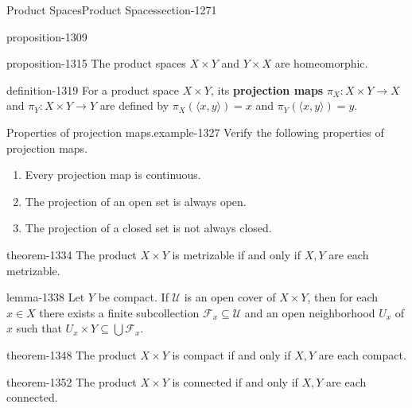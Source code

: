 \documentclass[oneside,10pt,]{article}
\newcommand{\terminology}[1]{\textbf{#1}}
\newcommand{\tuple}[1]{\langle #1 \rangle}
\newcommand{\mc}{\mathcal}
\begin{document}
\begin{sectionptx}{Product Spaces}{}{Product Spaces}{}{}{section-1271}
\begin{proposition}{}{}{proposition-1309}
\end{proposition}
\begin{proposition}{}{}{proposition-1315}%
\hypertarget{p-1316}{}%
The product spaces \(X\times Y\) and \(Y\times X\) are homeomorphic.%
\end{proposition}
\begin{definition}{}{definition-1319}%
\hypertarget{p-1320}{}%
For a product space \(X\times Y\), its \terminology{projection maps} \(\pi_X:X\times Y\to X\) and \(\pi_Y:X\times Y\to Y\) are defined by \(\pi_X(\tuple{x,y})=x\) and \(\pi_Y(\tuple{x,y})=y\).%
\end{definition}
\begin{example}{Properties of projection maps.}{example-1327}%
\hypertarget{p-1329}{}%
Verify the following properties of projection maps.%
\leavevmode%
\begin{enumerate}
\item\hypertarget{li-1331}{}Every projection map is continuous.%
\item\hypertarget{li-1332}{}The projection of an open set is always open.%
\item\hypertarget{li-1333}{}The projection of a closed set is not always closed.%
\end{enumerate}
\end{example}
\begin{theorem}{}{}{theorem-1334}%
\hypertarget{p-1335}{}%
The product \(X\times Y\) is metrizable if and only if \(X,Y\) are each metrizable.%
\end{theorem}
\begin{lemma}{}{}{lemma-1338}%
\hypertarget{p-1339}{}%
Let \(Y\) be compact. If \(\mc U\) is an open cover of \(X\times Y\), then for each \(x\in X\) there exists a finite subcollection \(\mc F_x\subseteq\mc U\) and an open neighborhood \(U_x\) of \(x\) such that \(U_x\times Y\subseteq\bigcup\mc F_x\).%
\end{lemma}
\begin{theorem}{}{}{theorem-1348}%
\hypertarget{p-1349}{}%
The product \(X\times Y\) is compact if and only if \(X,Y\) are each compact.%
\end{theorem}
\begin{theorem}{}{}{theorem-1352}%
\hypertarget{p-1353}{}%
The product \(X\times Y\) is connected if and only if \(X,Y\) are each connected.%
\end{theorem}
\end{sectionptx}
%
%
\typeout{************************************************}
\end{document}
